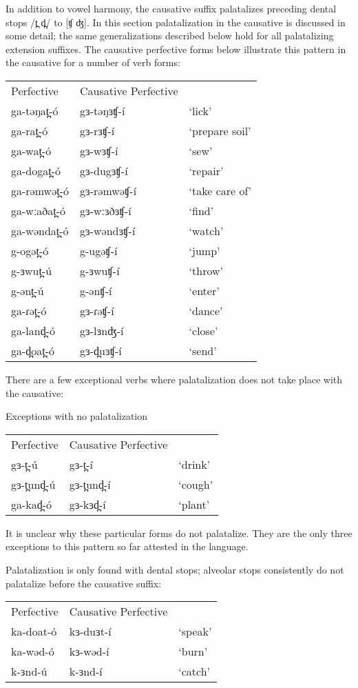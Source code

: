 In addition to vowel harmony, the causative suffix palatalizes preceding dental stops /t̪ d̪/  to [ʧ ʤ]. In this section palatalization in the causative is discussed in some detail; the same generalizations described below hold for all palatalizing extension suffixes. The causative perfective forms below illustrate this pattern in the causative for a number of verb forms:
\ea   \begin{tabular}[t]{lll}     
Perfective	& Causative Perfective 	& 	 \\
ga-təŋat̪-ó	& gɜ-təŋɜʧ-í & ‘lick’	\\
ga-rat̪-ó	&	gɜ-rɜʧ-í & ‘prepare soil’\\ 
ga-wat̪-ó	&	gɜ-wɜʧ-í & ‘sew’\\
ga-dogat̪-ó	&	gɜ-dugɜʧ-í & ‘repair’\\
ga-rəmwət̪-ó&	gɜ-rəmwəʧ-í & ‘take care of’\\
ga-wːaðat̪-ó&	gɜ-wːɜðɜʧ-í & ‘find’\\
ga-wəndat̪-ó&	gɜ-wəndɜʧ-í & ‘watch’\\	
g-ogət̪-ó	&g-ugəʧ-í & ‘jump’\\
g-ɜwut̪-ú	&g-ɜwuʧ-í & ‘throw’\\
g-ənt̪-ú		&g-ənʧ-í & ‘enter’\\
ga-ɾət̪-ó	&gɜ-ɾəʧ-í & ‘dance’\\
ga-land̪-ó	&gɜ-lɜnʤ-í & ‘close’\\
ga-d̪oat̪-ó	&gɜ-d̪uɜʧ-í & ‘send’\\
\end{tabular} \z 

There are a few exceptional verbs where palatalization does not take place with the causative:

\ea Exceptions with no palatalization\\
\begin{tabular}[t]{lll}
Perfective	& 	Causative Perfective & \\
gɜ-t̪-ú	& gɜ-t̪-í & ‘drink’	\\ 
gɜ-t̪und̪-ú	& gɜ-t̪und̪-í & ‘cough’	\\ 
ga-kad̪-ó	& gɜ-kɜd̪-í & ‘plant’	\\	
\end{tabular} \z 
It is unclear why these particular forms do not palatalize. They are the only three exceptions to this pattern so far attested in the language. 

Palatalization is only found with dental stops; alveolar stops consistently do not palatalize before the causative suffix:
\ea \begin{tabular}[t]{lll}
	Perfective&	Causative Perfective & \\
ka-doat-ó	&kɜ-duɜt-í & ‘speak’\\	
ka-wəd-ó	&kɜ-wəd-í & ‘burn’	\\
	k-ɜnd-ú	&k-ɜnd-í & ‘catch’ 	\\
 \end{tabular}
\z

